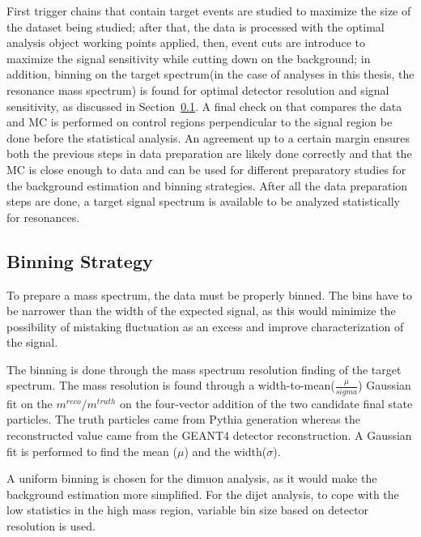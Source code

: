 First trigger chains that contain target events are studied to maximize the size of the dataset being studied; after that, the data is processed with the optimal analysis object working points applied, then, event cuts are introduce to maximize the signal sensitivity while cutting down on the background; in addition, binning on the target spectrum(in the case of analyses in this thesis, the resonance mass spectrum) is found for optimal detector resolution and signal sensitivity, as discussed in
Section~\ref{sec:binning}. A final check on that compares the data and MC is performed on control regions perpendicular to the signal region be done before the statistical analysis. An agreement up to a certain margin ensures both the previous steps in data preparation are likely done correctly and that the MC is close enough to data and can be used for different preparatory studies for the background estimation and binning strategies. After all the data preparation steps are done, a target signal spectrum is available to be analyzed statistically for resonances. 

\subsection{Binning Strategy} 
\label{sec:binning}

To prepare a mass spectrum, the data must be properly binned. The bins have to be narrower than the width of the expected signal, as this would minimize the possibility of mistaking fluctuation as an excess and improve characterization of the signal.

The binning is done through the mass spectrum resolution finding of the target spectrum. The mass resolution is found through a width-to-mean($\frac{\mu}{sigma}$) Gaussian fit on the $m^{reco}/m^{truth}$ on the four-vector addition of the two candidate final state particles. The truth particles came from Pythia generation whereas the reconstructed value came from the GEANT4 detector reconstruction. A Gaussian fit is performed to find the mean ($\mu$) and the width($\sigma$).

A uniform binning is chosen for the dimuon analysis, as it would make the background estimation more simplified. For the dijet analysis, to cope with the low statistics in the high mass region, variable bin size based on detector resolution is used. 

